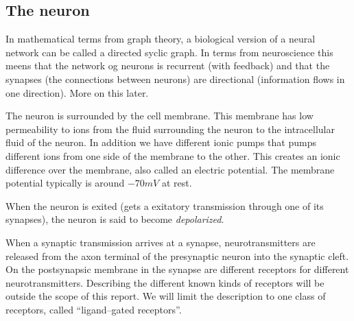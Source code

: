 \subsection{The neuron}
\label{ssecTheNeuron}
In mathematical terms from graph theory, a biological version of a neural network can be called a directed syclic graph. 
In terms from neuroscience this meens that the network og neurons is recurrent (with feedback) and that the synapses (the connections between neurons) are directional (information flows in one direction). More on this later.


The neuron is surrounded by the cell membrane. This membrane has low permeability to ions from the fluid surrounding the neuron to the intracellular fluid of the neuron.
In addition we have different ionic pumps that pumps different ions from one side of the membrane to the other. This creates an ionic difference over the membrane, also called an electric potential.
The membrane potential typically is around $-70mV$ at rest.


When the neuron is exited (gets a exitatory transmission through one of its synapses), the neuron is said to become \emph{depolarized}. 

When a synaptic transmission arrives at a synapse, neurotransmitters are released from the axon terminal of the presynaptic neuron into the synaptic cleft.
On the postsynapsic membrane in the synapse are different receptors for different neurotransmitters\cite{PrinciplesOfNeuralScience4edKAP09}. 
Describing the different known kinds of receptors will be outside the scope of this report. We will limit the description to one class of receptors, called ``ligand--gated receptors''.

